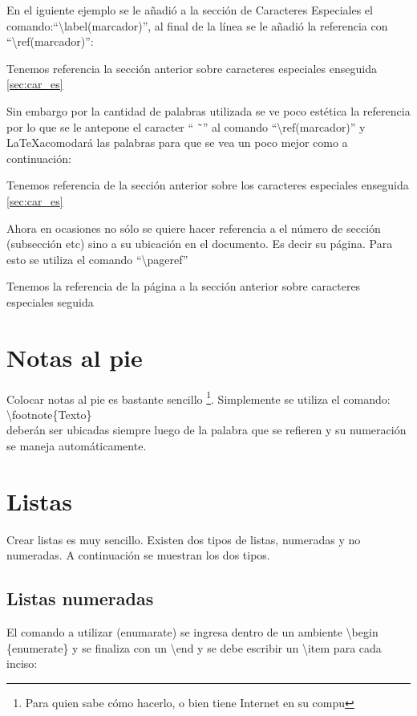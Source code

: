 \documentclass{article}
\begin{document}
En el iguiente ejemplo se le a\~nadi\'o a la secci\'on de Caracteres Especiales el comando:``\textbackslash label(marcador)'', al final de la l\'inea se le a\~nadi\'o la referencia con ``\textbackslash ref(marcador)'':

Tenemos referencia la secci\'on anterior sobre caracteres especiales enseguida \ref{sec:car_es}

Sin embargo por la cantidad de palabras utilizada se ve poco est\'etica la referencia por lo que se le antepone el caracter `` \~\ '' al comando ``\textbackslash ref(marcador)'' y \LaTeX acomodar\'a las palabras para que se vea un poco mejor como a continuaci\'on:

Tenemos referencia de la secci\'on anterior sobre los caracteres especiales enseguida \ref{sec:car_es}

Ahora en ocasiones no s\'olo se quiere hacer referencia a el n\'umero de secci\'on (subsecci\'on etc) sino a su ubicaci\'on en el documento. Es decir su p\'agina. Para esto se utiliza el comando ``\textbackslash pageref''

Tenemos la referencia de la p\'agina a la secci\'on anterior sobre caracteres especiales seguida \pageref{sec:car_es}


\section{Notas al pie}
Colocar notas al pie es bastante sencillo
\footnote{Para quien sabe c\'omo hacerlo, o bien tiene Internet en su compu}.
Simplemente se utiliza el comando:\\

\textbackslash footnote\{Texto\}\\

deber\'an ser ubicadas siempre luego de la palabra que se refieren y su numeraci\'on se maneja autom\'aticamente.


\section{Listas}
Crear listas es muy sencillo. Existen dos tipos de listas, numeradas y no numeradas. A continuaci\'on se muestran los dos tipos.

\subsection{Listas numeradas}
El comando a utilizar (enumarate) se ingresa dentro de un ambiente \textbackslash begin \{enumerate\} y se finaliza con un \textbackslash end y se debe escribir un \textbackslash item para cada inciso:
\end{document}
